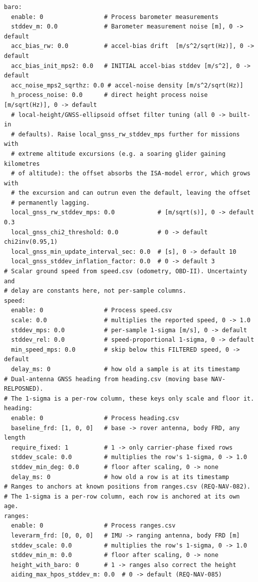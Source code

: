 \documentclass[11pt,a4paper]{article}
\begin{document}
\begin{lstlisting}[style=cfg]
baro:
  enable: 0                 # Process barometer measurements
  stddev_m: 0.0             # Barometer measurement noise [m], 0 -> default
  acc_bias_rw: 0.0          # accel-bias drift  [m/s^2/sqrt(Hz)], 0 -> default
  acc_bias_init_mps2: 0.0   # INITIAL accel-bias stddev [m/s^2], 0 -> default
  acc_noise_mps2_sqrthz: 0.0 # accel-noise density [m/s^2/sqrt(Hz)]
  h_process_noise: 0.0      # direct height process noise [m/sqrt(Hz)], 0 -> default
  # local-height/GNSS-ellipsoid offset filter tuning (all 0 -> built-in
  # defaults). Raise local_gnss_rw_stddev_mps further for missions with
  # extreme altitude excursions (e.g. a soaring glider gaining kilometres
  # of altitude): the offset absorbs the ISA-model error, which grows with
  # the excursion and can outrun even the default, leaving the offset
  # permanently lagging.
  local_gnss_rw_stddev_mps: 0.0            # [m/sqrt(s)], 0 -> default 0.3
  local_gnss_chi2_threshold: 0.0           # 0 -> default chi2inv(0.95,1)
  local_gnss_min_update_interval_sec: 0.0  # [s], 0 -> default 10
  local_gnss_stddev_inflation_factor: 0.0  # 0 -> default 3
# Scalar ground speed from speed.csv (odometry, OBD-II). Uncertainty and
# delay are constants here, not per-sample columns.
speed:
  enable: 0                 # Process speed.csv
  scale: 0.0                # multiplies the reported speed, 0 -> 1.0
  stddev_mps: 0.0           # per-sample 1-sigma [m/s], 0 -> default
  stddev_rel: 0.0           # speed-proportional 1-sigma, 0 -> default
  min_speed_mps: 0.0        # skip below this FILTERED speed, 0 -> default
  delay_ms: 0               # how old a sample is at its timestamp
# Dual-antenna GNSS heading from heading.csv (moving base NAV-RELPOSNED).
# The 1-sigma is a per-row column, these keys only scale and floor it.
heading:
  enable: 0                 # Process heading.csv
  baseline_frd: [1, 0, 0]   # base -> rover antenna, body FRD, any length
  require_fixed: 1          # 1 -> only carrier-phase fixed rows
  stddev_scale: 0.0         # multiplies the row's 1-sigma, 0 -> 1.0
  stddev_min_deg: 0.0       # floor after scaling, 0 -> none
  delay_ms: 0               # how old a row is at its timestamp
# Ranges to anchors at known positions from ranges.csv (REQ-NAV-082).
# The 1-sigma is a per-row column, each row is anchored at its own age.
ranges:
  enable: 0                 # Process ranges.csv
  leverarm_frd: [0, 0, 0]   # IMU -> ranging antenna, body FRD [m]
  stddev_scale: 0.0         # multiplies the row's 1-sigma, 0 -> 1.0
  stddev_min_m: 0.0         # floor after scaling, 0 -> none
  height_with_baro: 0       # 1 -> ranges also correct the height
  aiding_max_hpos_stddev_m: 0.0  # 0 -> default (REQ-NAV-085)


\end{lstlisting}
\end{document}
